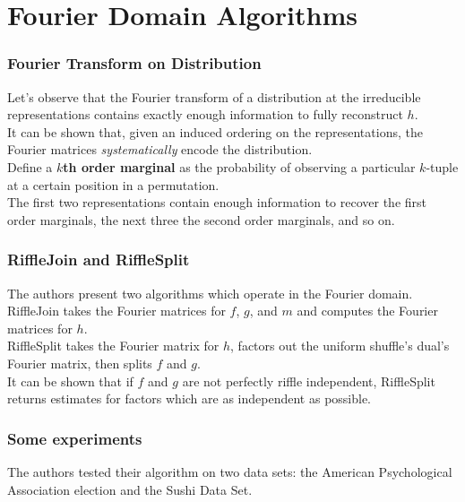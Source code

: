 \documentclass{beamer} %
\theoremstyle{definition} %
\def \pausenl {\pause $ \ $\\}
\begin{document}
\section{Fourier Domain Algorithms}

\begin{frame}
	\frametitle{Fourier Transform on Distribution}
	
	Let's observe that the Fourier transform of a distribution at the irreducible representations contains exactly enough information to fully reconstruct $h$.\\
	\pausenl
	
	It can be shown that, given an induced ordering on the representations, the Fourier matrices \textit{systematically} encode the distribution.\\
	\pausenl
	
	Define a \textbf{$k$th order marginal} as the probability of observing a particular $k$-tuple at a certain position in a permutation.\\
	
	\pausenl
	
	The first two representations contain enough information to recover the first order marginals, the next three the second order marginals, and so on.
\end{frame}

\begin{frame}
	\frametitle{RiffleJoin and RiffleSplit}
	
	The authors present two algorithms which operate in the Fourier domain.\\\pausenl
	
	RiffleJoin takes the Fourier matrices for $f$, $g$, and $m$ and computes the Fourier matrices for $h$.\\
	
	RiffleSplit takes the Fourier matrix for $h$, factors out the uniform shuffle's dual's Fourier matrix, then splits $f$ and $g$.\\\pausenl
	
	It can be shown that if $f$ and $g$ are not perfectly riffle independent, RiffleSplit returns estimates for factors which are as independent as possible.
\end{frame}


\begin{frame}
	\frametitle{Some experiments}
	
	The authors tested their algorithm on two data sets: the American Psychological Association election and the Sushi Data Set.
\end{frame}
\end{document}
